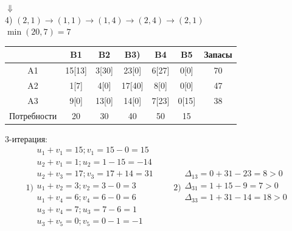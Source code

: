 \documentclass[a4paper, 12pt]{article}
\begin{document}
\begin{center}
  $\Downarrow$\\
  4) $(2,1)\rightarrow(1,1)\rightarrow(1,4)\rightarrow(2,4)\rightarrow(2,1)$\\
  $\min(20,7) = 7$
\end{center}
\begin{table}[H]
\centering
\begin{tabular}{|c|c|c|c|c|c|c|}
\hline
     & B1       & B2       & B3)       & B4        & B5        & Запасы \\ \hline
A1   & 15[13]   & 3[30]    & 23[0]     & 6[27]     & 0[0]      & 70     \\ \hline
A2   & 1[7]     & 4[0]     & 17[40]    & 8[0]      & 0[0]      & 47     \\ \hline
A3   & 9[0]     & 13[0]    & 14[0]     & 7[23]     & 0[15]     & 38     \\ \hline
Потребности & 20       & 30       & 40        & 50        & 15        &        \\ \hline
\end{tabular}
\end{table}

3-итерация:\\
\begin{equation*}
  1)\begin{split}
    u_1 + v_1 = 15; v_1 = 15-0 = 15\\
    u_2 + v_1 = 1; u_2 = 1-15 = -14\\
    u_2 + v_3 = 17; v_3 = 17+14 = 31\\
    u_1 + v_2 = 3; v_2 = 3-0 = 3\\
    u_1 + v_4 = 6; v_4 = 6-0 = 6\\
    u_3 + v_4 = 7; u_3 = 7-6 = 1\\
    u_3 + v_5 = 0; v_5 = 0-1 = -1\\
  \end{split}
  \qquad  
  2)\begin{split}
    \Delta_{13} = 0+31-23= 8 > 0 \\
    \Delta_{31} = 1+15-9= 7 > 0 \\
    \Delta_{33} = 1+31-14= 18 > 0 \\
  \end{split}
\end{equation*}
\end{document}
